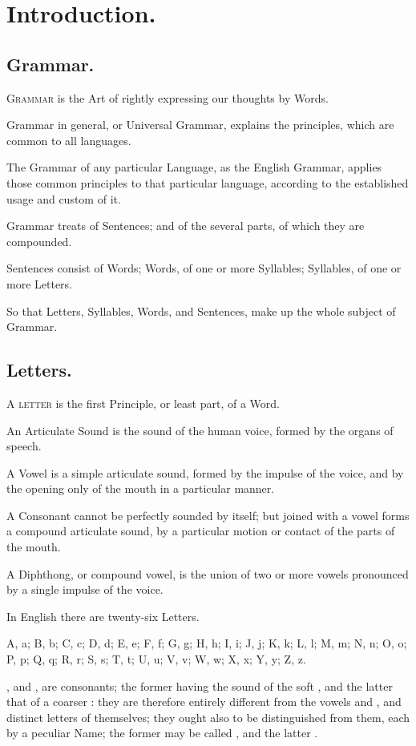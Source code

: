 \chapter{Introduction.}

\section{Grammar.}

\textsc{Grammar} is the Art of rightly expressing our thoughts by Words.

Grammar in general, or Universal Grammar, explains the principles, which
are common to all languages.

The Grammar of any particular Language, as the English Grammar, applies
those common principles to that particular language, according to the
established usage and custom of it.

Grammar treats of Sentences; and of the several parts, of which they are
compounded.

Sentences consist of Words; Words, of one or more Syllables; Syllables,
of one or more Letters.

So that Letters, Syllables, Words, and Sentences, make up the whole
subject of Grammar.

\section{Letters.}

\textsc{A letter} is the first Principle, or least part, of a Word.

An Articulate Sound is the sound of the human voice, formed by the
organs of speech.

A Vowel is a simple articulate sound, formed by the impulse of the
voice, and by the opening only of the mouth in a particular manner.

A Consonant cannot be perfectly sounded by itself; but joined with a
vowel forms a compound articulate sound, by a particular motion or
contact of the parts of the mouth.

A Diphthong, or compound vowel, is the union of two or more vowels
pronounced by a single impulse of the voice.

In English there are twenty-six Letters.

A, a; B, b; C, c; D, d; E, e; F, f; G, g; H, h; I, i; J, j; K, k; L, l;
M, m; N, n; O, o; P, p; Q, q; R, r; S, s; T, t; U, u; V, v; W, w; X, x;
Y, y; Z, z.

, and , are consonants; the former having the sound of
the soft , and the latter that of a coarser : they are
therefore entirely different from the vowels  and , and
distinct letters of themselves; they ought also to be distinguished from
them, each by a peculiar Name; the former may be called , and the
latter .

